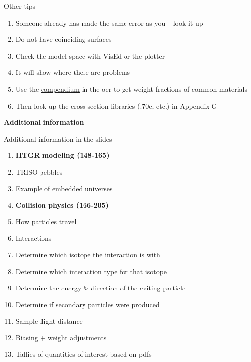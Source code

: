 \documentclass[aspectratio=1610,pdftex,dvipsnames,compress,xcolor={dvipsnames}]{beamer}
\newcommand{\acs}{\acrshort} %
\begin{document}
\addtocounter{framenumber}{-1} 
\begin{frame}{Other tips}
    \begin{enumerate}[series=outerlist,topsep=0pt,itemsep=21pt,leftmargin=*,label=(\arabic*)]
        \item[]Someone already has made the same error as you -- look it up
        \item[]Do not have coinciding surfaces
        \item[]Check the model space with VisEd or the plotter
        \item[]It will show where there are problems
        \item[]Use the \href{https://uidaho.pressbooks.pub/nuclearengineering/chapter/mcnp/}{compendium} in the \acs{oer} to get weight fractions of common materials
        \item[]Then look up the cross section libraries (.70c, etc.) in Appendix G
    \end{enumerate}
\end{frame}


\begin{frame}[plain]{}
    \centering\LARGE\textbf{Additional information}
\end{frame}


\addtocounter{framenumber}{-1} 
\begin{frame}{Additional information in the slides}
    \begin{enumerate}[series=outerlist,topsep=0pt,itemsep=3pt,leftmargin=*,label=(\arabic*)]
        \item[]\textbf{HTGR modeling (148-165)}
        \item[]TRISO pebbles
        \item[]Example of embedded universes
            \vspace{0.05in}
        \item[]\textbf{Collision physics (166-205)}
        \item[]How particles travel
        \item[]Interactions
        \item[]Determine which isotope the interaction is with  
        \item[]Determine which interaction type for that isotope  
        \item[]Determine the energy \& direction of the exiting particle  
        \item[]Determine if secondary particles were produced  
        \item[]Sample flight distance  
        \item[]Biasing + weight adjustments  
        \item[]Tallies of quantities of interest based on pdfs
    \end{enumerate}
\end{frame}
\end{document}
